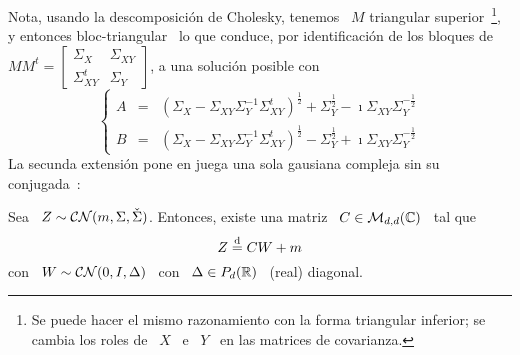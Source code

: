 %
Nota,  usando  la  descomposici\'on   de  Cholesky,  tenemos  \  $M$  triangular
superior~\footnote{Se puede hacer el  mismo razonamiento con la forma triangular
  inferior;  se cambia  los roles  de \  $X$  \ e  \ $Y$  \ en  las matrices  de
  covarianza.},   y   entonces   bloc-triangular   \   lo   que   conduce,   por
identificaci\'on  de  los bloques  de  \ $M  M^t  =  \begin{bmatrix} \Sigma_X  &
  \Sigma_{XY}  \\  \Sigma_{XY}^t &  \Sigma_Y  \end{bmatrix}$,  a una  soluci\'on
posible con
%
%
%
%
\[
\left\{\begin{array}{lll}
A & = & \left( \Sigma_X - \Sigma_{XY} \Sigma_Y^{-1} \Sigma_{XY}^t
\right)^{\frac12} + \Sigma_Y^{\frac12} - \imath \Sigma_{XY}
\Sigma_Y^{-\frac12}\\[2.5mm]
%
B & = &  \left( \Sigma_X - \Sigma_{XY} \Sigma_Y^{-1} \Sigma_{XY}^t
\right)^{\frac12} - \Sigma_Y^{\frac12} + \imath \Sigma_{XY}
\Sigma_Y^{-\frac12}
\end{array}\right.
\]
%
La  secunda  extensi\'on  pone  en  juega  una sola  gausiana  compleja  sin  su
conjugada~\cite{EriKoi06, SchSch03}:
%
\begin{teorema}
\label{Teo:MP:GausianaComplejaWIDiago}
%
  Sea \ $Z \sim \mathcal{C}\mathcal{N}(m,\Sigma,\check{\Sigma})$. Entonces, existe una matriz \ $C
  \in \mathcal{M}_{d,d}(\mathbb{C})$ \ tal que
  \[
  Z \stackrel{\mathrm{d}}{=} C W + m
  \]
  con \ $W \sim \mathcal{C}\mathcal{N}(0,I,\Delta)$ \ con \ $\Delta \in P_d(\mathbb{R})$ \ (real) diagonal.
\end{teorema}
